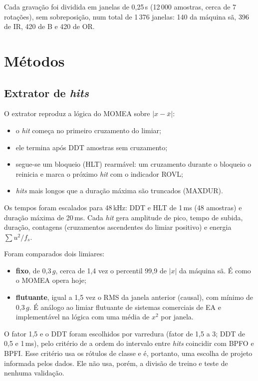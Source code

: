 \documentclass[12pt]{article}
\begin{document}
Cada gravação foi dividida em janelas de 0,25\,s (12\,000 amostras, cerca de 7 rotações), sem sobreposição, num total de 1\,376 janelas: 140 da máquina sã, 396 de IR, 420 de B e 420 de OR.

\section{Métodos}
\label{sec:metodos}

\subsection{Extrator de \textit{hits}}

O extrator reproduz a lógica do MOMEA sobre \(|x - \bar{x}|\):
\begin{itemize}
	\item o \textit{hit} começa no primeiro cruzamento do limiar;
	\item ele termina após DDT amostras sem cruzamento;
	\item segue-se um bloqueio (HLT) rearmável: um cruzamento durante o bloqueio o reinicia e marca o próximo \textit{hit} com o indicador ROVL;
	\item \textit{hits} mais longos que a duração máxima são truncados (MAXDUR).
\end{itemize}
Os tempos foram escalados para 48\,kHz: DDT e HLT de 1\,ms (48 amostras) e duração máxima de 20\,ms. Cada \textit{hit} gera amplitude de pico, tempo de subida, duração, contagens (cruzamentos ascendentes do limiar positivo) e energia \(\sum u^2/f_s\).

Foram comparados dois limiares:
\begin{itemize}
	\item \textbf{fixo}, de 0,3\,\(g\), cerca de 1,4 vez o percentil 99,9 de \(|x|\) da máquina sã. É como o MOMEA opera hoje;
	\item \textbf{flutuante}, igual a 1,5 vez o RMS da janela anterior (causal), com mínimo de 0,3\,\(g\). É análogo ao limiar flutuante de sistemas comerciais de EA \cite{vallen2022} e implementável na lógica com uma média de \(x^2\) por janela.
\end{itemize}
O fator 1,5 e o DDT foram escolhidos por varredura (fator de 1,5 a 3; DDT de 0,5 e 1\,ms), pelo critério de a ordem do intervalo entre \textit{hits} coincidir com BPFO e BPFI. Esse critério usa os rótulos de classe e é, portanto, uma escolha de projeto informada pelos dados. Ele não usa, porém, a divisão de treino e teste de nenhuma validação.
\end{document}
